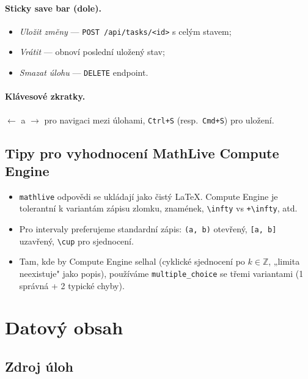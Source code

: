 \documentclass[11pt,a4paper]{article}
\begin{document}
\paragraph{Sticky save bar (dole).}
\begin{itemize}
  \item \emph{Uložit změny} --- \texttt{POST /api/tasks/<id>} s celým stavem;
  \item \emph{Vrátit} --- obnoví poslední uložený stav;
  \item \emph{Smazat úlohu} --- \texttt{DELETE} endpoint.
\end{itemize}

\paragraph{Klávesové zkratky.}
$\leftarrow$ a $\rightarrow$ pro navigaci mezi úlohami, \texttt{Ctrl+S} (resp.~\texttt{Cmd+S}) pro uložení.

\subsection{Tipy pro vyhodnocení MathLive Compute Engine}

\begin{itemize}
  \item \texttt{mathlive} odpovědi se ukládají jako čistý LaTeX. Compute Engine je tolerantní k variantám zápisu zlomku, znamének, \texttt{\textbackslash infty} vs \texttt{+\textbackslash infty}, atd.
  \item Pro intervaly preferujeme standardní zápis: \texttt{(a, b)} otevřený, \texttt{[a, b]} uzavřený, \texttt{\textbackslash cup} pro sjednocení.
  \item Tam, kde by Compute Engine selhal (cyklické sjednocení po $k \in \mathbb{Z}$, „limita neexistuje" jako popis), používáme \texttt{multiple\_choice} se třemi variantami (1 správná + 2 typické chyby).
\end{itemize}

\section{Datový obsah}\label{sec:zdroje}

\subsection{Zdroj úloh}
\end{document}
